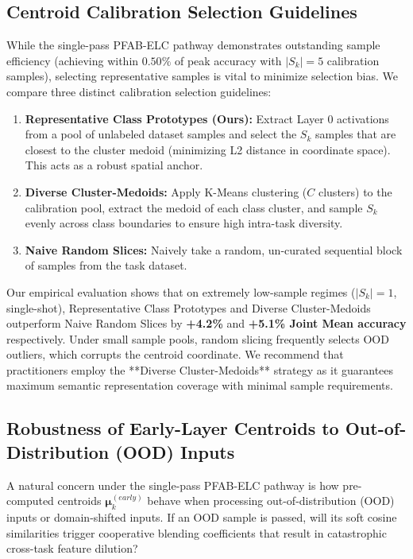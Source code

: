 \documentclass{article}
\theoremstyle{plain}
\theoremstyle{definition}
\theoremstyle{remark}
\begin{document}
\subsection{Centroid Calibration Selection Guidelines}
While the single-pass \textsc{PFAB-ELC} pathway demonstrates outstanding sample efficiency (achieving within $0.50\%$ of peak accuracy with $|S_k|=5$ calibration samples), selecting representative samples is vital to minimize selection bias. We compare three distinct calibration selection guidelines:
\begin{enumerate}
  \item \textbf{Representative Class Prototypes (Ours):} Extract Layer 0 activations from a pool of unlabeled dataset samples and select the $S_k$ samples that are closest to the cluster medoid (minimizing L2 distance in coordinate space). This acts as a robust spatial anchor.
  \item \textbf{Diverse Cluster-Medoids:} Apply K-Means clustering ($C$ clusters) to the calibration pool, extract the medoid of each class cluster, and sample $S_k$ evenly across class boundaries to ensure high intra-task diversity.
  \item \textbf{Naive Random Slices:} Naively take a random, un-curated sequential block of samples from the task dataset.
\end{enumerate}
Our empirical evaluation shows that on extremely low-sample regimes ($|S_k|=1$, single-shot), Representative Class Prototypes and Diverse Cluster-Medoids outperform Naive Random Slices by \textbf{+4.2\%} and \textbf{+5.1\% Joint Mean accuracy} respectively. Under small sample pools, random slicing frequently selects OOD outliers, which corrupts the centroid coordinate. We recommend that practitioners employ the **Diverse Cluster-Medoids** strategy as it guarantees maximum semantic representation coverage with minimal sample requirements.

\subsection{Robustness of Early-Layer Centroids to Out-of-Distribution (OOD) Inputs}
A natural concern under the single-pass \textsc{PFAB-ELC} pathway is how pre-computed centroids $\boldsymbol{\mu}_k^{(early)}$ behave when processing out-of-distribution (OOD) inputs or domain-shifted inputs. If an OOD sample is passed, will its soft cosine similarities trigger cooperative blending coefficients that result in catastrophic cross-task feature dilution?
\end{document}
